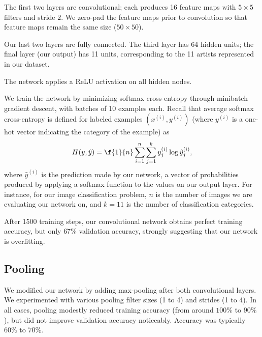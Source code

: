 \documentclass{article}
\newcommand{\sind}[1]{^{(#1)}}
\begin{document}
\begin{multicols}{2}
The first two layers are convolutional;
each produces 16 feature maps
with $5\times 5$ filters and stride $2$.
We zero-pad the feature maps prior to convolution
so that feature maps remain the same size ($50\times 50$).

Our last two layers are fully connected.
The third layer has 64 hidden units;
the final layer (our output) has 11 units,
corresponding to the 11 artists represented in our dataset.

The network applies a ReLU activation on all hidden nodes.

We train the network by minimizing softmax cross-entropy
through minibatch gradient descent,
with batches of 10 examples each.
Recall that average softmax cross-entropy is defined
for labeled examples $(x\sind{i}, y\sind{i})$
(where $y\sind{i}$ is a one-hot vector indicating the category of the example)
as
\begin{equation}
    H(y, \hat y) = \f{1}{n}\sum_{i=1}^n
                             \sum_{j=1}^k
                               y\sind{i}_j \log \hat y\sind{i}_j,
\end{equation}
where $\hat y\sind{i}$ is the prediction made by our network,
a vector of probabilities
produced by applying a softmax function
to the values on our output layer.
For instance, for our image classification problem,
$n$ is the number of images we are evaluating our network on,
and $k=11$ is the number of classification categories.

After 1500 training steps,
our convolutional network obtains perfect training accuracy,
but only $67\%$ validation accuracy,
strongly suggesting that our network is overfitting.

\subsection{Pooling}

We modified our network by adding max-pooling
after both convolutional layers.
We experimented with various pooling filter sizes (1 to 4)
and strides (1 to 4).
In all cases,
pooling modestly reduced training accuracy
(from around $100\%$ to $90\%$),
but did not improve validation accuracy noticeably.
Accuracy was typically $60\%$ to $70\%$.


\end{multicols}
\end{document}
